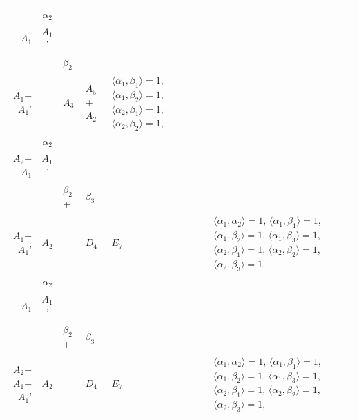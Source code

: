 \documentclass[12pt]{report}
\begin{document}
\begin{appendix}
{\begin{longtable}{rcl p{1cm}p{1cm}p{3cm} }
\\
\begin{tabular}{cc}$\alpha_1$+ & $\alpha_2$\\\tiny{ $A_1$ } & \tiny{ $A_1$' }\end{tabular} &\begin{tabular}{c} = \\~ \end{tabular} & \begin{tabular}{cc}$\beta_1$+ & $\beta_2$\\\tiny{ $A_1$+$A_1$' } & \tiny{  }\end{tabular} & $A_3$ & $A_5$+$A_2$ &  $\langle\alpha_1, \beta_1\rangle=1$, $\langle\alpha_1, \beta_2\rangle=1$, $\langle\alpha_2, \beta_1\rangle=1$, $\langle\alpha_2, \beta_2\rangle=1$, 
\\
\begin{tabular}{cc}$\alpha_1$+ & $\alpha_2$\\\tiny{ $A_2$+$A_1$ } & \tiny{ $A_1$' }\end{tabular} &\begin{tabular}{c} = \\~ \end{tabular} & \begin{tabular}{ccc}$\beta_1$+ & $\beta_2$+ & $\beta_3$\\\tiny{ $A_1$+$A_1$' } & \tiny{ $A_2$ } & \tiny{  }\end{tabular} & $D_4$ & $E_7$ & $\langle\alpha_1, \alpha_2\rangle=1$,  $\langle\alpha_1, \beta_1\rangle=1$, $\langle\alpha_1, \beta_2\rangle=1$, $\langle\alpha_1, \beta_3\rangle=1$, $\langle\alpha_2, \beta_1\rangle=1$, $\langle\alpha_2, \beta_2\rangle=1$, $\langle\alpha_2, \beta_3\rangle=1$, 
\\
\begin{tabular}{cc}$\alpha_1$+ & $\alpha_2$\\\tiny{ $A_1$ } & \tiny{ $A_1$' }\end{tabular} &\begin{tabular}{c} = \\~ \end{tabular} & \begin{tabular}{ccc}$\beta_1$+ & $\beta_2$+ & $\beta_3$\\\tiny{ $A_2$+$A_1$+$A_1$' } & \tiny{ $A_2$ } & \tiny{  }\end{tabular} & $D_4$ & $E_7$ & $\langle\alpha_1, \alpha_2\rangle=1$,  $\langle\alpha_1, \beta_1\rangle=1$, $\langle\alpha_1, \beta_2\rangle=1$, $\langle\alpha_1, \beta_3\rangle=1$, $\langle\alpha_2, \beta_1\rangle=1$, $\langle\alpha_2, \beta_2\rangle=1$, $\langle\alpha_2, \beta_3\rangle=1$, 

\end{longtable}}
\end{appendix}
\end{document}
